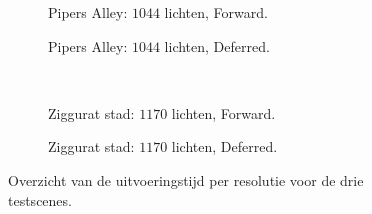 \begin{figure}[t]
  \begin{adjustbox}{minipage=\textwidth, scale=0.6}
    \begin{subfigure}[b]{0.8\textwidth}
      \centering
      \def\svgwidth{\textwidth}
      
      \caption{Pipers Alley: $1044$ lichten, Forward.}
      \label{fig:ts-resolution-forward:alley}
    \end{subfigure}
  \end{adjustbox}\hspace{-0.075\textwidth} %
  \begin{adjustbox}{minipage=\textwidth, scale=0.6}
    \begin{subfigure}[b]{0.8\textwidth}
      \centering
      \def\svgwidth{\textwidth}
      
      \caption{Pipers Alley: $1044$ lichten, Deferred.}
      \label{fig:ts-resolution-deferred:alley}
    \end{subfigure}
  \end{adjustbox} \\
  \begin{adjustbox}{minipage=\textwidth, scale=0.6}
    \begin{subfigure}[b]{0.8\textwidth}
      \centering
      \def\svgwidth{\textwidth}
      
      \caption{Ziggurat stad: $1170$ lichten, Forward.}
      \label{fig:ts-resolution-forward:city}
    \end{subfigure}
  \end{adjustbox}\hspace{-0.075\textwidth} %
  \begin{adjustbox}{minipage=\textwidth, scale=0.6}
    \begin{subfigure}[b]{0.8\textwidth}
      \centering
      \def\svgwidth{\textwidth}
      
      \caption{Ziggurat stad: $1170$ lichten, Deferred.}
      \label{fig:ts-resolution-deferred:city}
    \end{subfigure}
  \end{adjustbox}
  \caption{Overzicht van de uitvoeringstijd per resolutie voor de drie testscenes.}
  \label{fig:ts-resolution}
\end{figure}


